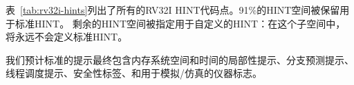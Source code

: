 表~\ref{tab:rv32i-hints}列出了所有的RV32I HINT代码点。91\%的HINT空间被保留用于标准HINT。
剩余的HINT空间被指定用于自定义的HINT：在这个子空间中，将永远不会定义标准HINT。

\begin{commentary}
我们预计标准的提示最终包含内存系统空间和时间的局部性提示、分支预测提示、线程调度提示、安全性标签、和用于模拟/仿真的仪器标志。
\end{commentary}

